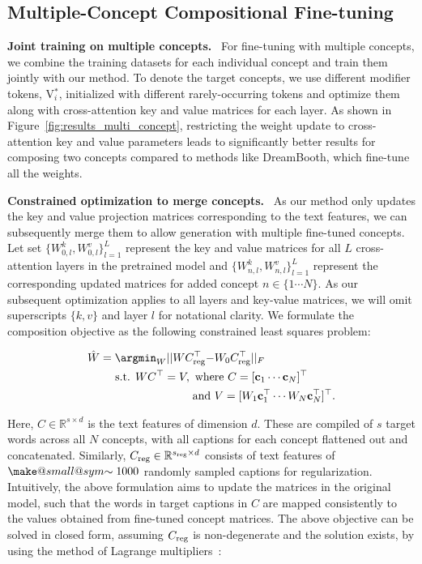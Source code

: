 \subsection{Multiple-Concept Compositional Fine-tuning}\label{sec:multi-concept}

  \textbf{Joint training on multiple concepts.} \ 
For fine-tuning with multiple concepts, we combine the training datasets for each individual concept and train them jointly with our method. To denote the target concepts, we use different modifier tokens, {\menlo V$_i^*$}, initialized with different rarely-occurring tokens and optimize them along with cross-attention key and value matrices for each layer. As shown in Figure~\ref{fig:results_multi_concept}, restricting the weight update to cross-attention key and value parameters leads to significantly better results for composing two concepts compared to methods like DreamBooth, which fine-tune all the weights.

  \textbf{Constrained optimization to merge concepts.} \ 
As our method only updates the key and value projection matrices corresponding to the text features, we can subsequently merge them to allow generation with multiple fine-tuned concepts. Let set $\{ W^k_{0,l}, W^v_{0,l} \}_{l=1}^L$ represent the key and value matrices for all $L$ cross-attention layers in the pretrained model and $\{W^k_{n,l}, W^v_{n,l}\}_{l=1}^L$ represent the corresponding updated matrices for added concept $n \in \{1 \cdots N\}$. As our subsequent optimization applies to all layers and key-value matrices, we will omit superscripts $\{k, v\}$ and layer $l$ for notational clarity. We formulate the composition objective as the following constrained least squares problem:

\begin{equation}
    \begin{split}
     \hat{W} = \argmin_{W} ||  W C_{\textnormal{reg}}^\top - & W_{0}C_{\textnormal{reg}}^\top ||_F \\
     \textnormal{s.t. }   WC^\top = V, \textnormal{ whe}& \textnormal{re } C = [{\mathbf{c}}_1 \cdots {\mathbf{c}}_N]^\top \\
     \textnormal{and } & V = [W_{1}{\mathbf{c}}_1^\top \cdots W_{N}{\mathbf{c}}_N^\top]^\top.
    \end{split}\label{eq:formulation}
\end{equation}

 Here, $C \in \mathbb{R}^{s \times d}$ is the text features of dimension $d$. These are compiled of $s$ target words across all $N$ concepts, with all captions for each concept flattened out and concatenated. Similarly, $C_{\textnormal{reg}} \in \mathbb{R}^{s_{\textnormal{reg}} \times d} $ consists of text features of $\mathrel{\mathpalette\make@small@sym{\sim}}1000$ randomly sampled captions for regularization. Intuitively, the above formulation aims to update the matrices in the original model, such that the words in target captions in $C$ are mapped consistently to the values obtained from fine-tuned concept matrices. The above objective can be solved in closed form, assuming $C_{\textnormal{reg}}$ is non-degenerate and the solution exists, by using the method of Lagrange multipliers~\cite{boyd2004convex}:

